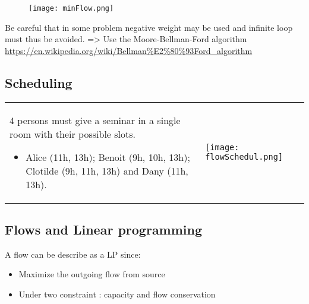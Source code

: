 \begin{figure}[!ht]
    \centering
    \texttt{[image: minFlow.png]}
\end{figure}

Be careful that in some problem negative weight may be used and infinite
loop must thus be avoided. => Use the Moore-Bellman-Ford algorithm
\url{https://en.wikipedia.org/wiki/Bellman%E2%80%93Ford_algorithm} 



\subsection{Scheduling}

\begin{tabular}{m{8cm}m{7cm}}
4 persons must give a seminar in a
single room with their possible slots.
\begin{itemize}
    \item  Alice (11h, 13h); Benoit (9h, 10h, 13h);
        Clotilde (9h, 11h, 13h) and Dany (11h, 13h).
\end{itemize}
&
\texttt{[image: flowSchedul.png]}
\end{tabular}


\subsection{Flows and Linear programming}
A flow can be describe as a LP since:
\begin{itemize}
    \item Maximize the outgoing flow from source
    \item Under two constraint : capacity and flow conservation
\end{itemize}


